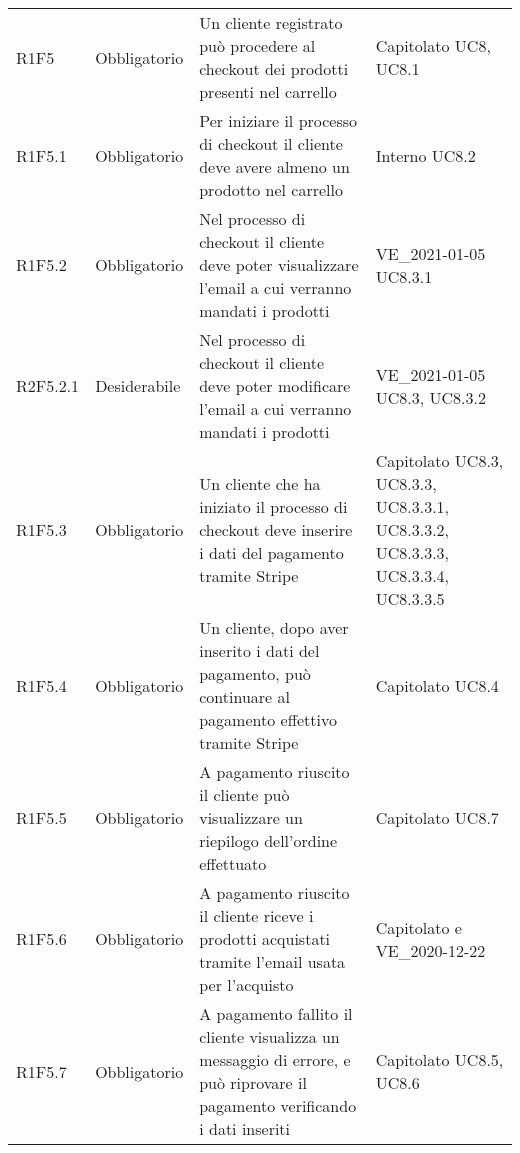 {\begin{longtable}{C{2.5cm} C{2.8cm} C{6.7cm} C{2.5cm}}
R1F5 & Obbligatorio & Un cliente registrato può procedere al checkout dei prodotti presenti nel carrello & Capitolato \newline UC8, UC8.1\\
R1F5.1 & Obbligatorio & Per iniziare il processo di checkout il cliente deve avere almeno un prodotto nel carrello & Interno \newline UC8.2\\
R1F5.2 & Obbligatorio & Nel processo di checkout il cliente deve poter visualizzare l'email a cui verranno mandati i prodotti & VE\_2021-01-05 \newline UC8.3.1 \\
R2F5.2.1 & Desiderabile & Nel processo di checkout il cliente deve poter modificare l'email a cui verranno mandati i prodotti & VE\_2021-01-05 \newline UC8.3, UC8.3.2 \\
R1F5.3 & Obbligatorio & Un cliente che ha iniziato il processo di checkout deve inserire i dati del pagamento tramite Stripe & Capitolato \newline UC8.3, UC8.3.3, UC8.3.3.1, UC8.3.3.2, UC8.3.3.3, UC8.3.3.4, UC8.3.3.5\\
R1F5.4 & Obbligatorio & Un cliente, dopo aver inserito i dati del pagamento, può continuare al pagamento effettivo tramite Stripe & Capitolato \newline UC8.4\\
R1F5.5 & Obbligatorio & A pagamento riuscito il cliente può visualizzare un riepilogo dell'ordine effettuato & Capitolato \newline UC8.7\\
R1F5.6 & Obbligatorio & A pagamento riuscito il cliente riceve i prodotti acquistati tramite l'email usata per l'acquisto & Capitolato e VE\_2020-12-22 \\
R1F5.7 & Obbligatorio & A pagamento fallito il cliente visualizza un messaggio di errore, e può riprovare il pagamento verificando i dati inseriti & Capitolato \newline UC8.5, UC8.6\\



\end{longtable}}
